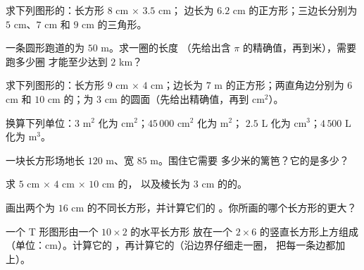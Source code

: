\begin{exercise}[$\star$]\label{exo:g6:measure:2}
求下列图形的：长方形 $8$ cm $\times$ $3.5$ cm；
边长为 $6.2$ cm 的正方形；三边长分别为 $5$ cm、$7$ cm
和 $9$ cm 的三角形。
\end{exercise}

\begin{exercise}[$\star$]\label{exo:g6:measure:3}
一条圆形跑道的为 $50$ m。求一圈的长度
（先给出含 $\pi$ 的精确值，再到米），需要跑多少圈
才能至少达到 $2$ km？
\end{exercise}

\begin{exercise}[$\star$]\label{exo:g6:measure:4}
求下列图形的：长方形 $9$ cm $\times$ $4$ cm；边长为
$7$ m 的正方形；两直角边分别为 $6$ cm 和 $10$ cm 的；为
$3$ cm 的圆面（先给出精确值，再到 cm$^2$）。
\end{exercise}

\begin{exercise}[$\star$]\label{exo:g6:measure:5}
换算下列单位：$3$ m$^2$ 化为 cm$^2$；$45\,000$ cm$^2$ 化为 m$^2$；
$2.5$ L 化为 cm$^3$；$4\,500$ L 化为 m$^3$。
\end{exercise}

\begin{exercise}[$\star$]\label{exo:g6:measure:6}
一块长方形场地长 $120$ m、宽 $85$ m。围住它需要
多少米的篱笆？它的是多少？
\end{exercise}

\begin{exercise}[$\star$]\label{exo:g6:measure:7}
求 $5$ cm $\times$ $4$ cm $\times$ $10$ cm 的，
以及棱长为 $3$ cm 的的。
\end{exercise}

\begin{exercise}[$\star$]\label{exo:g6:measure:8}
画出两个为 $16$ cm 的不同长方形，并计算它们的
。你所画的哪个长方形的更大？
\end{exercise}

\begin{exercise}[$\star\star$]\label{exo:g6:measure:9}
一个 T 形图形由一个 $10 \times 2$ 的水平长方形
放在一个 $2 \times 6$ 的竖直长方形上方组成（单位：cm）。计算它的
，再计算它的（沿边界仔细走一圈，
把每一条边都加上）。
\end{exercise}

